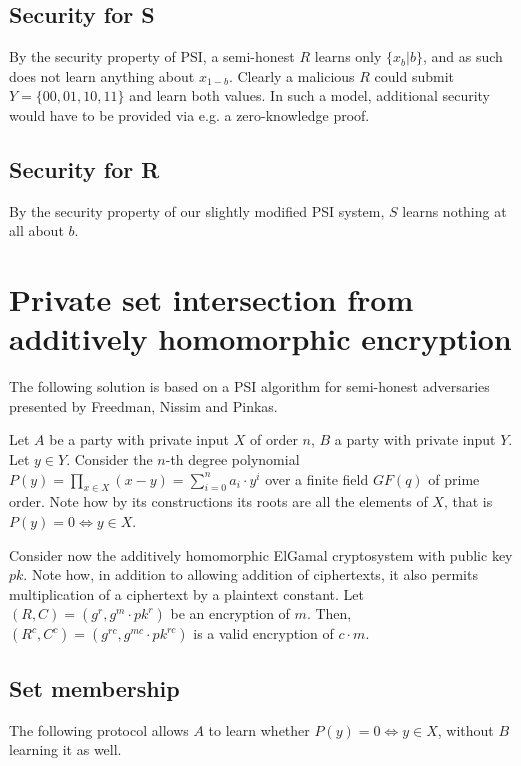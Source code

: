 \documentclass[a4paper]{scrreprt}
\begin{document}
\subsection{Security for S}

By the security property of PSI, a semi-honest $R$ learns only $\{x_b | b\}$,
and as such does not learn anything about $x_{1 - b}$. Clearly a malicious $R$
could submit $Y = \{00, 01, 10, 11\}$ and learn both values. In such a model,
additional security would have to be provided via e.g. a zero-knowledge proof.

\subsection{Security for R}

By the security property of our slightly modified PSI system, $S$ learns
nothing at all about $b$.

\section{Private set intersection from additively homomorphic encryption}

The following solution is based on a PSI algorithm for semi-honest adversaries
presented by Freedman, Nissim and Pinkas.  \autocite{efficientPSIPolynomials}

Let $A$ be a party with private input $X$ of order $n$, $B$ a party with
private input $Y$. Let $y \in Y$.  Consider the $n$-th degree polynomial $P(y)
= \prod_{x \in X}(x - y) = \sum_{i=0}^{n} a_i \cdot y^i$ over a finite field
$GF(q)$ of prime order. Note how by its constructions its roots are all the
elements of $X$, that is $P(y) = 0 \Leftrightarrow y \in X$.

Consider now the additively homomorphic ElGamal cryptosystem with public key
$pk$. Note how, in addition to allowing addition of ciphertexts, it also
permits multiplication of a ciphertext by a plaintext constant. Let $(R, C) =
(g^r, g^m \cdot pk^r)$ be an encryption of $m$. Then, $(R^c, C^c) = (g^{rc},
g^{mc} \cdot pk^{rc})$ is a valid encryption of $c \cdot m$.

\subsection{Set membership}

The following protocol allows $A$ to learn whether $P(y) = 0 \Leftrightarrow y
\in X$, without $B$ learning it as well.
\end{document}
